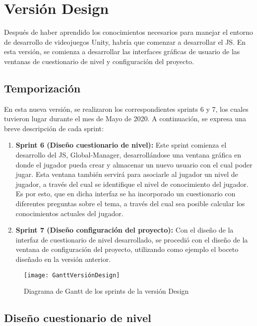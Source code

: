 \section{Versión Design}
\label{sec:VersionDesign}

Después de haber aprendido los conocimientos necesarios para manejar el entorno de desarrollo de videojuegos Unity, habría que comenzar a desarrollar el JS. En esta versión, se comienza a desarrollar las interfaces gráficas de usuario de las ventanas de cuestionario de nivel y configuración del proyecto. 

\subsection{Temporización}
\label{sec:TemporizacionDesign}

En esta nueva versión, se realizaron los correspondientes sprints 6 y 7, los cuales tuvieron lugar durante el mes de Mayo de 2020. A continuación, se expresa una breve descripción de cada sprint:

\begin{enumerate}
	\item \textbf{Sprint 6 (Diseño cuestionario de nivel):} Este sprint comienza el desarrollo del JS, Global-Manager, desarrollándose una ventana gráfica en donde el jugador pueda crear y almacenar un nuevo usuario con el cual poder jugar. Esta ventana también servirá para asociarle al jugador un nivel de jugador, a través del cual se identifique el nivel de conocimiento del jugador. Es por esto, que en dicha interfaz se ha incorporado un cuestionario con diferentes preguntas sobre el tema, a través del cual sea posible calcular los conocimientos actuales del jugador.
	\item \textbf{Sprint 7 (Diseño configuración del proyecto):} Con el diseño de la interfaz de cuestionario de nivel desarrollado, se procedió con el diseño de la ventana de configuración del proyecto, utilizando como ejemplo el boceto diseñado en la versión anterior. 
\end{enumerate}

\begin{figure}[htb]
	\centering
	\texttt{[image: GanttVersiónDesign]}
	\caption[Diagrama de Gantt de los sprints de la versión Design]{Diagrama de Gantt de los sprints de la versión Design}
	\label{fig:GanttVersionDesign}
\end{figure}

\subsection{Diseño cuestionario de nivel}
\label{sec:DiseñoCuestionarioNivel}

